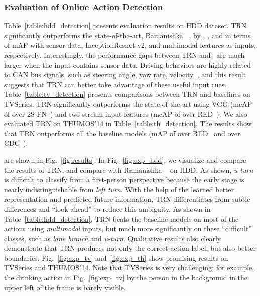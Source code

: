 \subsubsection{Evaluation of Online Action Detection}
\vspace{-5pt} Table~\ref{table:hdd_detection} presents evaluation
results on HDD dataset. TRN significantly outperforms the
state-of-the-art, Ramanishka \etal~\cite{RamanishkaCVPR2018}, by
, , and  in terms of mAP with sensor data,
InceptionResnet-v2, and multimodal features as inputs, respectively.
Interestingly, the performance gaps between TRN
and~\cite{RamanishkaCVPR2018} are much
larger when the input contains sensor data. Driving
behaviors are highly related to CAN bus signals, such as steering
angle, yaw rate, velocity, \etc, and this result suggests that TRN can better take
advantage of these useful input cues.
Table~\ref{table:tv_detection} presents comparisons between TRN and
baselines on TVSeries. TRN
significantly outperforms the state-of-the-art using VGG (mcAP of  over
2S-FN~\cite{de2018modeling})  and 
two-stream input features (mcAP of  over
RED~\cite{gao2017red}). We also
evaluated TRN on THUMOS'14 in
Table~\ref{table:th_detection}. The results show that TRN outperforms
all the baseline models (mAP of  over RED~\cite{gao2017red} and
 over CDC~\cite{shou2017cdc}).

 are shown in Fig.~\ref{fig:results}.
In Fig.~\ref{fig:exp_hdd}, we visualize and compare the results of TRN,
and compare with Ramanishka \etal~\cite{RamanishkaCVPR2018} on HDD. As shown,
\textit{u-turn} is difficult to classify from a first-person perspective
because the early stage is nearly indistinguishable from
\textit{left turn}. With the help of the learned better representation
and predicted future information, TRN differentiates from
subtle differences and ``look ahead'' to reduce this
ambiguity. As shown in Table~\ref{table:hdd_detection}, TRN beats the
baseline models on most of the actions using \textit{multimodal}
inputs, but much more significantly on these ``difficult'' classes, such as
\textit{lane branch} and \textit{u-turn}.
Qualitative
results also clearly demonstrate that TRN produces not only the correct
action label, but also better boundaries. Fig.~\ref{fig:exp_tv}
and~\ref{fig:exp_th} show promising results on
TVSeries and THUMOS'14. Note that TVSeries is very
challenging; for example, the drinking action in Fig.~\ref{fig:exp_tv} 
by the person in the background in the upper left of the frame
is barely visible.

